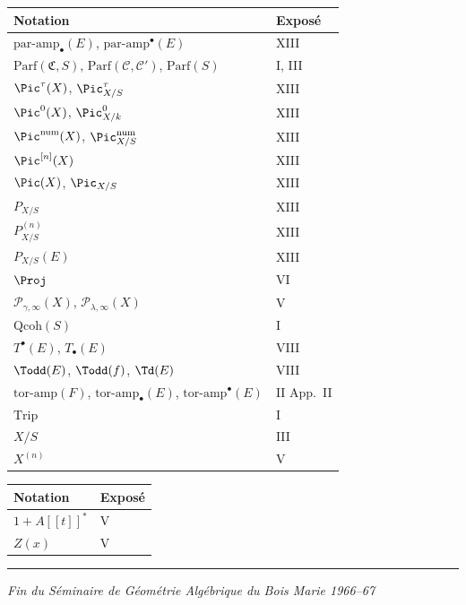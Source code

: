 \begin{longtable}{p{7cm}l}
\toprule
\textbf{Notation} & \textbf{Expos\'e} \\
\midrule
\endhead

$\mathrm{par\text{-}amp}_{\bullet}(E)$, $\mathrm{par\text{-}amp}^{\bullet}(E)$ & XIII \\
$\mathrm{Parf}(\mathfrak{C}, S)$, $\mathrm{Parf}(\mathcal{C}, \mathcal{C}')$, $\mathrm{Parf}(S)$ & I, III \\
$\Pic^{\tau}(X)$, $\Pic^{\tau}_{X/S}$ & XIII \\
$\Pic^{0}(X)$, $\Pic^{0}_{X/k}$ & XIII \\
$\Pic^{\mathrm{num}}(X)$, $\Pic^{\mathrm{num}}_{X/S}$ & XIII \\
$\Pic^{[n]}(X)$ & XIII \\
$\Pic(X)$, $\Pic_{X/S}$ & XIII \\
$P_{X/S}$ & XIII \\
$P_{X/S}^{(n)}$ & XIII \\
$P_{X/S}(E)$ & XIII \\
$\Proj$ & VI \\
$\mathcal{P}_{\gamma, \infty}(X)$, $\mathcal{P}_{\lambda, \infty}(X)$ & V \\
$\mathrm{Qcoh}(S)$ & I \\
$T^{\bullet}(E)$, $T_{\bullet}(E)$ & VIII \\
$\Todd(E)$, $\Todd(f)$, $\Td(E)$ & VIII \\
$\mathrm{tor\text{-}amp}(F)$, $\mathrm{tor\text{-}amp}_{\bullet}(E)$, $\mathrm{tor\text{-}amp}^{\bullet}(E)$ & II App.\ II \\
$\mathrm{Trip}$ & I \\
$X/S$ & III \\
$X^{(n)}$ & V \\
\bottomrule
\end{longtable}

\vspace{1cm}

\begin{longtable}{p{7cm}l}
\toprule
\textbf{Notation} & \textbf{Expos\'e} \\
\midrule
\endhead

$1 + A[[t]]^{*}$ & V \\
$Z(x)$ & V \\
\bottomrule
\end{longtable}

\vfill
\begin{center}
\rule{0.5\textwidth}{0.4pt}

\medskip
\textit{Fin du S\'eminaire de G\'eom\'etrie Alg\'ebrique du Bois Marie 1966--67}
\end{center}



